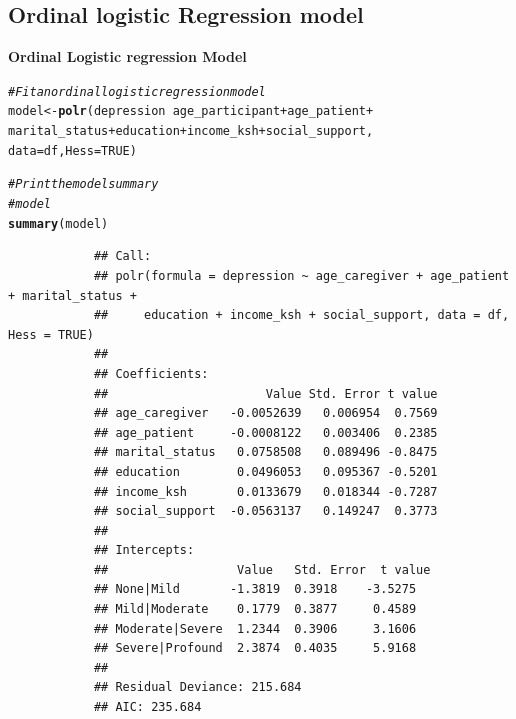 \documentclass{beamer}
\makeatletter
\newcommand{\hlnum}[1]{\textcolor[rgb]{0.686,0.059,0.569}{#1}}%
\newcommand{\hlcom}[1]{\textcolor[rgb]{0.678,0.584,0.686}{\textit{#1}}}%
\newcommand{\hlopt}[1]{\textcolor[rgb]{0,0,0}{#1}}%
\newcommand{\hlstd}[1]{\textcolor[rgb]{0.345,0.345,0.345}{#1}}%
\newcommand{\hlkwb}[1]{\textcolor[rgb]{0.69,0.353,0.396}{#1}}%
\newcommand{\hlkwc}[1]{\textcolor[rgb]{0.333,0.667,0.333}{#1}}%
\newcommand{\hlkwd}[1]{\textcolor[rgb]{0.737,0.353,0.396}{\textbf{#1}}}%
\newenvironment{kframe}{%
	\def\at@end@of@kframe{}%
	\ifinner\ifhmode%
	\def\at@end@of@kframe{\end{minipage}}%
\begin{minipage}{\columnwidth}%
	\fi\fi%
	\def\FrameCommand##1{\hskip\@totalleftmargin \hskip-\fboxsep
		\colorbox{shadecolor}{##1}\hskip-\fboxsep
		\hskip-\linewidth \hskip-\@totalleftmargin \hskip\columnwidth}%
	\MakeFramed {\advance\hsize-\width
		\@totalleftmargin\z@ \linewidth\hsize
		\@setminipage}}%
{\par\unskip\endMakeFramed%
	\at@end@of@kframe}
\newenvironment{knitrout}{}{} %
\numberwithin{equation}{section}
\numberwithin{table}{section}
\makeatother
\begin{document}
\subsection{Ordinal logistic Regression model}
\textbf{Ordinal Logistic regression Model}
\begin{knitrout}
	\color{fgcolor}\begin{kframe}
		\begin{alltt}
			\hlcom{# Fit an ordinal logistic regression model}
			\hlstd{model} \hlkwb{<-} \hlkwd{polr}\hlstd{(depression} \hlopt{~} \hlstd{age_participant} \hlopt{+} \hlstd{age_patient} \hlopt{+}
			\hlstd{marital_status} \hlopt{+} \hlstd{education} \hlopt{+} \hlstd{income_ksh} \hlopt{+} \hlstd{social_support,}
			\hlkwc{data} \hlstd{= df,}\hlkwc{Hess}\hlstd{=}\hlnum{TRUE}\hlstd{)}
		\end{alltt}
	\end{kframe}
\end{knitrout}
\begin{knitrout}
	\color{fgcolor}\begin{kframe}
		\begin{alltt}
			\hlcom{# Print the model summary}
			\hlcom{#model}
			\hlkwd{summary}\hlstd{(model)}
		\end{alltt}
		\begin{verbatim}
			## Call:
			## polr(formula = depression ~ age_caregiver + age_patient + marital_status + 
			##     education + income_ksh + social_support, data = df, Hess = TRUE)
			## 
			## Coefficients:
			##                      Value Std. Error t value
			## age_caregiver   -0.0052639   0.006954  0.7569
			## age_patient     -0.0008122   0.003406  0.2385
			## marital_status   0.0758508   0.089496 -0.8475
			## education        0.0496053   0.095367 -0.5201
			## income_ksh       0.0133679   0.018344 -0.7287
			## social_support  -0.0563137   0.149247  0.3773
			## 
			## Intercepts:
			##                  Value   Std. Error  t value
			## None|Mild       -1.3819  0.3918    -3.5275
			## Mild|Moderate    0.1779  0.3877     0.4589
			## Moderate|Severe  1.2344  0.3906     3.1606
			## Severe|Profound  2.3874  0.4035     5.9168
			## 
			## Residual Deviance: 215.684 
			## AIC: 235.684
		\end{verbatim}
	\end{kframe}
\end{knitrout}
\end{document}
